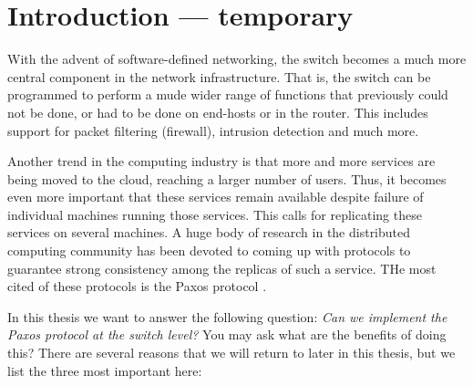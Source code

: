 \chapter{Introduction --- temporary}

With the advent of software-defined networking, the switch becomes a much
more central component in the network infrastructure.
%
That is, the switch can be programmed to perform a mude wider range of
functions that previously could not be done, or had to be done on end-hosts
or in the router.
%
This includes support for packet filtering (firewall), intrusion detection
and much more.


Another trend in the computing industry is that more and more services are
being moved to the cloud, reaching a larger number of users.
%
Thus, it becomes even more important that these services remain available
despite failure of individual machines running those services.
%
This calls for replicating these services on several machines.
%
A huge body of research in the distributed computing community has been
devoted to coming up with protocols to guarantee strong consistency among
the replicas of such a service.
%
THe most cited of these protocols is the Paxos protocol \cite{Lam01}.
%

In this thesis we want to answer the following question: \textit{Can we
implement the Paxos protocol at the switch level?}
%
You may ask what are the benefits of doing this?
%
There are several reasons that we will return to later in this thesis, but
we list the three most important here:


